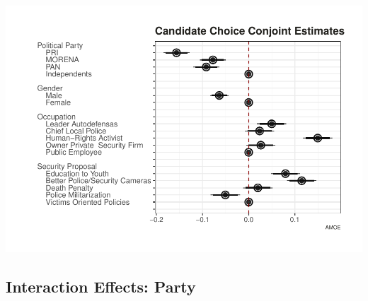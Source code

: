 \documentclass[12pt,]{article}
\begin{document}
\includegraphics{report_conjoint_candidate_pdf_files/figure-latex/unnamed-chunk-3-1.pdf}

\hypertarget{interaction-effects-party}{%
\subsection{Interaction Effects:
Party}\label{interaction-effects-party}}
\end{document}

